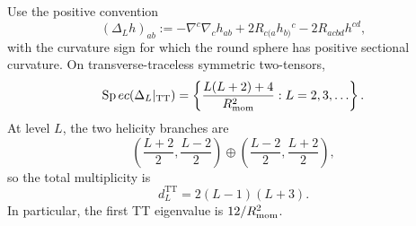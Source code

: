 \documentclass[11pt]{article}
\begin{document}
\begin{theorem}
\label{p1:thm:tt-lichnerowicz-spectrum}
Use the positive convention
\[
  (\Delta_Lh)_{ab}
  :=-\nabla^c\nabla_ch_{ab}
    +2R_{c(a}h_{b)}{}^c
    -2R_{acbd}h^{cd},
\]
with the curvature sign for which the round sphere has positive sectional
curvature.  On transverse-traceless symmetric two-tensors,
\[
  \operatorname{Sp}ec(\Delta_L|_{\mathrm{TT}})
  =\left\{\frac{L(L+2)+4}{R_{\mathrm{mom}}^2}:L=2,3,\ldots\right\}.
\]
At level \(L\), the two helicity branches are
\[
  \left(\frac{L+2}{2},\frac{L-2}{2}\right)
  \oplus
  \left(\frac{L-2}{2},\frac{L+2}{2}\right),
\]
so the total multiplicity is
\[
  d_L^{\mathrm{TT}}=2(L-1)(L+3).
\]
In particular, the first TT eigenvalue is \(12/R_{\mathrm{mom}}^2\).
\end{theorem}
\end{document}
